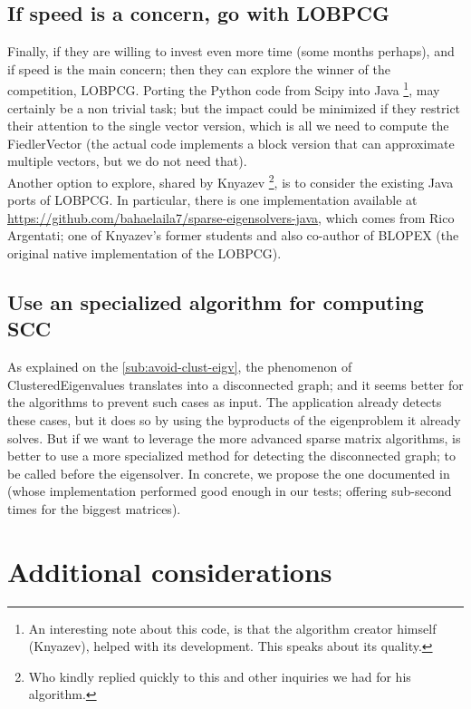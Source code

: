 \subsection{If speed is a concern, go with \gls{LOBPCG}}

Finally, if they are willing to invest even more time (some months
perhaps),  and if speed is the
main concern; then they can explore the winner of the competition,
\gls{LOBPCG}. Porting the Python code from Scipy into Java \footnote{An
  interesting note about this code, is that the algorithm creator
  himself (Knyazev), helped with its development. This speaks about
  its quality.}, may certainly be a non trivial task; but the impact
could be minimized if they restrict their attention to the single
vector version, which is all we need to compute the \gls{FiedlerVector} (the
actual code implements a block version that can approximate multiple
vectors, but we do not need that). \\

Another option to explore, shared by Knyazev \footnote{Who kindly
  replied quickly to this and other inquiries we had for his
  algorithm.}, is to consider the existing Java ports of
\gls{LOBPCG}. In particular, there is one implementation
available at
\url{https://github.com/bahaelaila7/sparse-eigensolvers-java}, which
comes from Rico Argentati; one of Knyazev's former students and also
co-author of BLOPEX \cite{blopex} (the original native
implementation of the \gls{LOBPCG}).

\subsection{Use an specialized algorithm for computing SCC}

As explained on the \cref{sub:avoid-clust-eigv}, the phenomenon of
\gls{ClusteredEigenvalues} translates into a disconnected graph; and
it seems better for the algorithms to prevent such cases as input. The
application already detects these cases, but it does so by using the
byproducts of the eigenproblem it already solves. But if we want to
leverage the more advanced sparse matrix algorithms, is better to use
a more specialized method for detecting the disconnected graph; to
be called before the eigensolver. In
concrete, we propose the one documented in \cite{pearce05} (whose
implementation performed good enough in our tests; offering sub-second
times for the biggest matrices). 

\section{Additional considerations}


